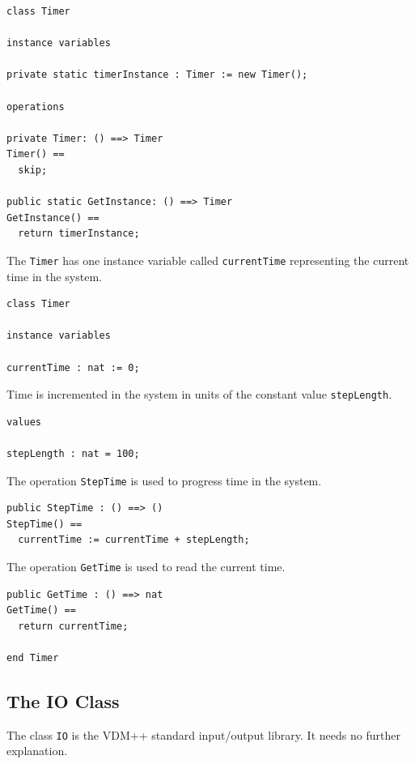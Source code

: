 \documentclass{overturerepchap}
\begin{document}
\begin{lstlisting}
class Timer

instance variables

private static timerInstance : Timer := new Timer(); 

operations

private Timer: () ==> Timer
Timer() ==
  skip;
  
public static GetInstance: () ==> Timer
GetInstance() ==
  return timerInstance;
\end{lstlisting}

The \texttt{Timer} has one instance variable called
\texttt{currentTime} representing the current time in the system. 

\begin{lstlisting}
class Timer

instance variables

currentTime : nat := 0;
\end{lstlisting}

Time is incremented in the system in units of the constant value
\texttt{stepLength}.

\begin{lstlisting}
values

stepLength : nat = 100;
\end{lstlisting}

The operation \texttt{StepTime} is used to progress time in the system.

\begin{lstlisting}
public StepTime : () ==> ()
StepTime() ==
  currentTime := currentTime + stepLength;
\end{lstlisting}

The operation \texttt{GetTime} is used to read the current time.

\begin{lstlisting}
public GetTime : () ==> nat
GetTime() ==
  return currentTime;

end Timer
\end{lstlisting}

\subsection{The IO Class}

The class \texttt{IO} is the VDM++ standard input/output library. It
needs no further explanation.
\end{document}
